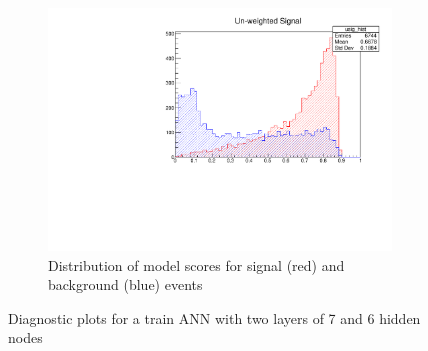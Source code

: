 \begin{figure}[h]
	\begin{subfigure}{0.5\textwidth}
	      \includegraphics[width=\textwidth]{img/sep}
	      \caption{Distribution of model scores for signal (red) and background (blue) events}
	\end{subfigure}

	\caption{Diagnostic plots for a train ANN with two layers of 7 and 6 hidden nodes }
	\label{fig:label}
\end{figure}